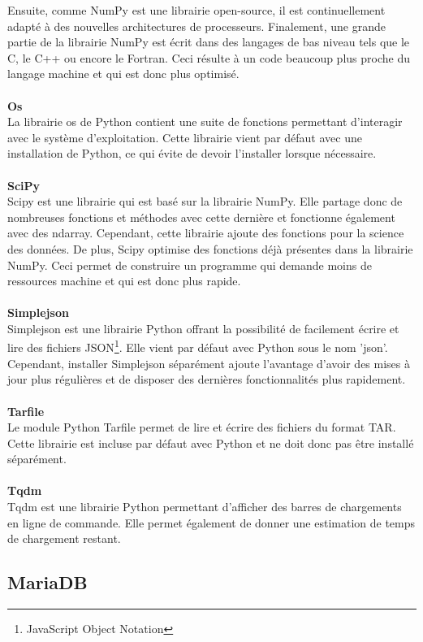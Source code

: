 \documentclass[11pt]{article}
\begin{document}
Ensuite, comme NumPy est une librairie open-source, il est continuellement adapté à des nouvelles architectures de processeurs.
Finalement, une grande partie de la librairie NumPy est écrit dans des langages de bas niveau tels que le C, le C++ ou encore le Fortran.
Ceci résulte à un code beaucoup plus proche du langage machine et qui est donc plus optimisé.\\
\\
\textbf{Os}\\
La librairie os de Python contient une suite de fonctions permettant d'interagir avec le système d'exploitation.
Cette librairie vient par défaut avec une installation de Python, ce qui évite de devoir l'installer lorsque nécessaire.\\
\\
\textbf{SciPy}\\
Scipy est une librairie qui est basé sur la librairie NumPy.
Elle partage donc de nombreuses fonctions et méthodes avec cette dernière et fonctionne également avec des ndarray.
Cependant, cette librairie ajoute des fonctions pour la science des données.
De plus, Scipy optimise des fonctions déjà présentes dans la librairie NumPy.
Ceci permet de construire un programme qui demande moins de ressources machine et qui est donc plus rapide.\\
\\
\textbf{Simplejson}\\
Simplejson est une librairie Python offrant la possibilité de facilement écrire et lire des fichiers JSON\footnote{JavaScript Object Notation}.
Elle vient par défaut avec Python sous le nom 'json'.
Cependant, installer Simplejson séparément ajoute l'avantage d'avoir des mises à jour plus régulières et de disposer des dernières fonctionnalités plus rapidement.\\
\\
\textbf{Tarfile}\\
Le module Python Tarfile permet de lire et écrire des fichiers du format TAR.
Cette librairie est incluse par défaut avec Python et ne doit donc pas être installé séparément.\\
\\
\textbf{Tqdm}\\
Tqdm est une librairie Python permettant d'afficher des barres de chargements en ligne de commande.
Elle permet également de donner une estimation de temps de chargement restant.\\

\subsection{MariaDB}
\end{document}
